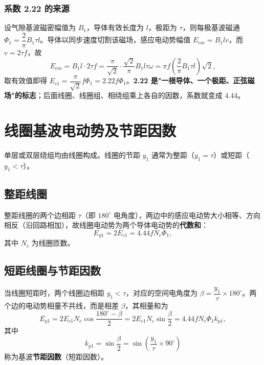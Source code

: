 
\subsubsection{系数 2.22 的来源}
设气隙基波磁密幅值为 $B_1$，导体有效长度为 $l$，极距为 $\tau$，则每极基波磁通 $\Phi_1=\dfrac{2}{\pi}B_1\tau l$。导体以同步速度切割该磁场，感应电动势幅值 $E_{cm}=B_1lv$，而 $v=2\tau f$，故
\begin{equation}
E_{cm}=B_1l\cdot2\tau f=\frac{\pi}{\sqrt2}\cdot\frac{\sqrt2}{\pi}B_1l\tau\omega
=\pi f\left(\frac{2}{\pi}B_1\tau l\right)\sqrt2 ,
\end{equation}
取有效值即得 $E_{c1}=\dfrac{\pi}{\sqrt2}f\Phi_1=2.22f\Phi_1$。\textbf{2.22 是"一根导体、一个极距、正弦磁场"的标志}；后面线圈、线圈组、相绕组乘上各自的因数，系数就变成 4.44。

\section{线圈基波电动势及节距因数}

单层或双层绕组均由线圈构成。线圈的节距 $y_1$ 通常为整距（$y_1=\tau$）或短距（$y_1<\tau$）。

\subsection{整距线圈}
整距线圈的两个边相距 $\tau$（即 $180^\circ$ 电角度），两边中的感应电动势大小相等、方向相反（沿回路相加），故线圈电动势为两个导体电动势的\textbf{代数和}：
\begin{equation}
E_{y1}=2E_{c1}=4.44fN_c\Phi_1 ,
\end{equation}
其中 $N_c$ 为线圈匝数。

\subsection{短距线圈与节距因数}
当线圈短距时，两个线圈边相距 $y_1<\tau$，对应的空间电角度为 $\beta=\dfrac{y_1}{\tau}\times180^\circ$。两个边的电动势相量不共线，而是相差 $\beta$，其相量和为
\begin{equation}
E_{y1}=2E_{c1}N_c\cos\frac{180^\circ-\beta}{2}=2E_{c1}N_c\sin\frac{\beta}{2}
=4.44fN_c\Phi_1k_{p1},
\end{equation}
其中
\begin{equation}
k_{p1}=\sin\frac{\beta}{2}=\sin\left(\frac{y_1}{\tau}\times90^\circ\right)
\end{equation}
称为基波\textbf{节距因数}（短距因数）。

